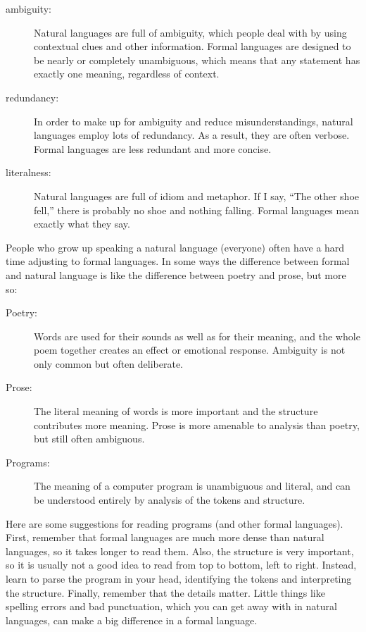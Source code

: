 \begin{description}

\item[ambiguity:] Natural languages are full of ambiguity, which
people deal with by using contextual clues and other information.
Formal languages are designed to be nearly or completely unambiguous,
which means that any statement has exactly one meaning,
regardless of context.

\item[redundancy:] In order to make up for ambiguity and reduce
misunderstandings, natural languages employ lots of
redundancy.  As a result, they are often verbose.  Formal languages
are less redundant and more concise.

\item[literalness:] Natural languages are full of idiom and
metaphor.  If I say, ``The other shoe fell,'' there is probably
no shoe and nothing falling.  Formal languages mean
exactly what they say.

\end{description}

People who grow up speaking a natural language (everyone) often have a
hard time adjusting to formal languages.  In some ways the difference
between formal and natural language is like the difference between
poetry and prose, but more so:


\begin{description}

\item[Poetry:] Words are used for their sounds as well as for
their meaning, and the whole poem together creates an effect or
emotional response.  Ambiguity is not only common but often
deliberate.

\item[Prose:] The literal meaning of words is more important
and the structure contributes more meaning.  Prose is more amenable to
analysis than poetry, but still often ambiguous.

\item[Programs:] The meaning of a computer program is unambiguous
and literal, and can be understood entirely by analysis of the
tokens and structure.

\end{description}

Here are some suggestions for reading programs (and other formal
languages).  First, remember that formal languages are much more dense
than natural languages, so it takes longer to read them.  Also, the
structure is very important, so it is usually not a good idea to read
from top to bottom, left to right.  Instead, learn to parse the
program in your head, identifying the tokens and interpreting the
structure.  Finally, remember that the details matter.  Little things
like spelling errors and bad punctuation, which you can get away
with in natural languages, can make a big difference in a formal
language.

